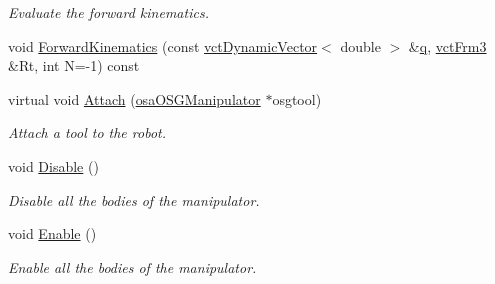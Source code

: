 \begin{DoxyCompactItemize}
\begin{DoxyCompactList}\small\item\em Evaluate the forward kinematics. \end{DoxyCompactList}\item 
void \hyperlink{classosa_o_d_e_manipulator_ae5c60de970e2f7fca3cdc8cbb816084e}{Forward\-Kinematics} (const \hyperlink{classvct_dynamic_vector}{vct\-Dynamic\-Vector}$<$ double $>$ \&\hyperlink{classosa_o_s_g_manipulator_a834ce7263dace4d925133753522abaa3}{q}, \hyperlink{vct_transformation_types_8h_a81feda0a02c2d1bc26e5553f409fed20}{vct\-Frm3} \&Rt, int N=-\/1) const 
\item 
virtual void \hyperlink{classosa_o_d_e_manipulator_a6864d11bf58688c76014734a28c0640f}{Attach} (\hyperlink{classosa_o_s_g_manipulator}{osa\-O\-S\-G\-Manipulator} $\ast$osgtool)
\begin{DoxyCompactList}\small\item\em Attach a tool to the robot. \end{DoxyCompactList}\item 
void \hyperlink{classosa_o_d_e_manipulator_aa285ecf833ff8dd1c4cf145be2b160be}{Disable} ()
\begin{DoxyCompactList}\small\item\em Disable all the bodies of the manipulator. \end{DoxyCompactList}\item 
void \hyperlink{classosa_o_d_e_manipulator_a15be7f15bc5363ed05771128b77954bc}{Enable} ()
\begin{DoxyCompactList}\small\item\em Enable all the bodies of the manipulator. \end{DoxyCompactList}\end{DoxyCompactItemize}
